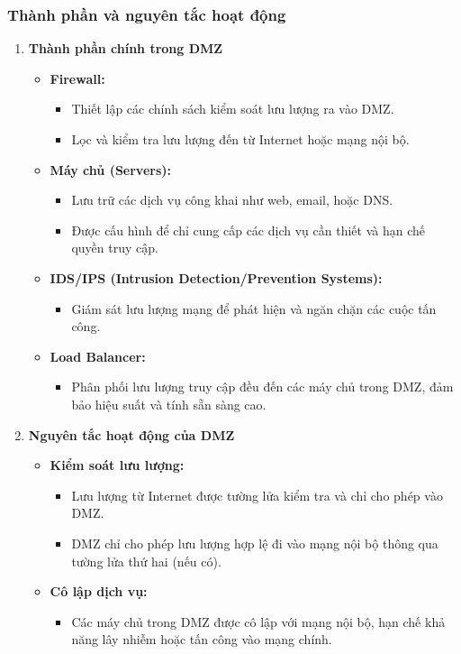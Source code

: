 \documentclass[13pt]{article}
\begin{document}
\subsubsection{Thành phần và nguyên tắc hoạt động}
\begin{enumerate}
    \item \textbf{Thành phần chính trong DMZ}
    \begin{itemize}
        \item \textbf{Firewall:}
        \begin{itemize}
            \item Thiết lập các chính sách kiểm soát lưu lượng ra vào DMZ.
            \item Lọc và kiểm tra lưu lượng đến từ Internet hoặc mạng nội bộ.
        \end{itemize}
        \item \textbf{Máy chủ (Servers):}
        \begin{itemize}
            \item Lưu trữ các dịch vụ công khai như web, email, hoặc DNS.
            \item Được cấu hình để chỉ cung cấp các dịch vụ cần thiết và hạn chế quyền truy cập.
        \end{itemize}
        \item \textbf{IDS/IPS (Intrusion Detection/Prevention Systems):}
        \begin{itemize}
            \item Giám sát lưu lượng mạng để phát hiện và ngăn chặn các cuộc tấn công.
        \end{itemize}
        \item \textbf{Load Balancer:}
        \begin{itemize}
            \item Phân phối lưu lượng truy cập đều đến các máy chủ trong DMZ, đảm bảo hiệu suất và tính sẵn sàng cao.
        \end{itemize}
    \end{itemize}

    \item \textbf{Nguyên tắc hoạt động của DMZ}
    \begin{itemize}
        \item \textbf{Kiểm soát lưu lượng:}
        \begin{itemize}
            \item Lưu lượng từ Internet được tường lửa kiểm tra và chỉ cho phép vào DMZ.
            \item DMZ chỉ cho phép lưu lượng hợp lệ đi vào mạng nội bộ thông qua tường lửa thứ hai (nếu có).
        \end{itemize}
        \item \textbf{Cô lập dịch vụ:}
        \begin{itemize}
            \item Các máy chủ trong DMZ được cô lập với mạng nội bộ, hạn chế khả năng lây nhiễm hoặc tấn công vào mạng chính.
        \end{itemize}
    \end{itemize}
\end{enumerate}
\end{document}
